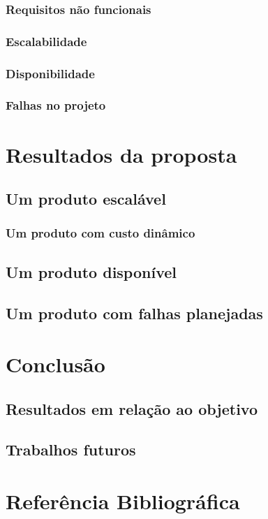\documentclass[]{../class/politex}
\begin{document}
      \subsection{Requisitos não funcionais}

      \subsection{Escalabilidade}

      \subsection{Disponibilidade}

      \subsection{Falhas no projeto}

  

  \chapter{Resultados da proposta}

    \section{Um produto escalável}

      \subsection{Um produto com custo dinâmico}

    \section{Um produto disponível}

    \section{Um produto com falhas planejadas}

  \chapter{Conclusão}

    \section{Resultados em relação ao objetivo}

    \section{Trabalhos futuros}

  \chapter{Referência Bibliográfica}
\end{document}
